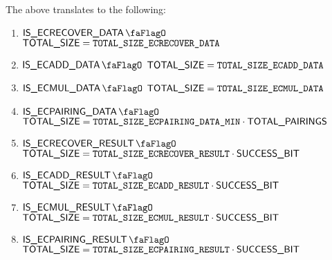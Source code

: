 \saNote{} The above translates to the following:
\begin{enumerate}
    \item \If $\isEcrecoverData$   \Then $\textsf{TOTAL\_SIZE} = \texttt{TOTAL\_SIZE\_ECRECOVER\_DATA}$
    \item \If $\isEcaddData$       \Then $\textsf{TOTAL\_SIZE} = \texttt{TOTAL\_SIZE\_ECADD\_DATA}$
    \item \If $\isEcmulData$       \Then $\textsf{TOTAL\_SIZE} = \texttt{TOTAL\_SIZE\_ECMUL\_DATA}$
    \item \If $\isEcpairingData$   \Then $\textsf{TOTAL\_SIZE} = \texttt{TOTAL\_SIZE\_ECPAIRING\_DATA\_MIN} \cdot \textsf{TOTAL\_PAIRINGS}$    %
    \item \If $\isEcrecoverResult$ \Then $\textsf{TOTAL\_SIZE} = \texttt{TOTAL\_SIZE\_ECRECOVER\_RESULT} \cdot \textsf{SUCCESS\_BIT}$
    \item \If $\isEcaddResult$     \Then $\textsf{TOTAL\_SIZE} = \texttt{TOTAL\_SIZE\_ECADD\_RESULT}     \cdot \textsf{SUCCESS\_BIT}$
    \item \If $\isEcmulResult$     \Then $\textsf{TOTAL\_SIZE} = \texttt{TOTAL\_SIZE\_ECMUL\_RESULT}     \cdot \textsf{SUCCESS\_BIT}$
    \item \If $\isEcpairingResult$ \Then $\textsf{TOTAL\_SIZE} = \texttt{TOTAL\_SIZE\_ECPAIRING\_RESULT} \cdot \textsf{SUCCESS\_BIT}$
\end{enumerate}
